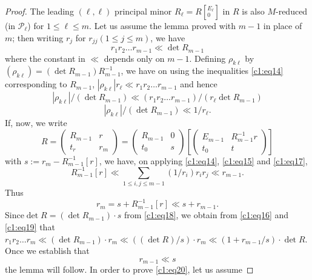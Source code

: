 \begin{proof}
The leading $(\ell,\ell)$ principal minor
$R_{\ell}=R[{}^{E_{\ell}}_{0}]$ in $R$ is also $M$-reduced (in
$\mathscr{P}_{\ell}$) for $1\leq \ell\leq m$. Let us assume the lemma
proved with $m-1$ in place of $m$; then writing $r_{j}$ for
$r_{jj}(1\leq j\leq m)$, we have
\begin{equation*}
r_{1}r_{2}\ldots r_{m-1}\ll \det R_{m-1}\tag{16}\label{c1:eq16}
\end{equation*}
where the constant in $\ll$ depends only on $m-1$. Defining
$\rho_{k\ell}$ by $(\rho_{k\ell})=(\det R_{m-1})R^{-1}_{m-1}$, we have
on using the inequalities \eqref{c1:eq14} corresponding to $R_{m-1}$,
$|\rho_{k\ell}|r_{\ell}\ll r_{1}r_{2}\ldots r_{m-1}$ and hence
$$
|\rho_{k\ell}|/(\det R_{m-1})\ll (r_{1}r_{2}\ldots
r_{m-1})/(r_{\ell}\det R_{m-1})
$$
\ie
\begin{equation*}
|\rho_{k\ell}|/(\det R_{m-1})\ll 1/r_{\ell}.\tag{17}\label{c1:eq17}
\end{equation*}
If, now, we write
\begin{equation*}
R=
\begin{pmatrix}
R_{m-1} & r\\
t_{r} & r_{m}
\end{pmatrix}
=
\begin{pmatrix}
R_{m-1} & 0\\
t_{0} & s
\end{pmatrix}
\left[
\begin{pmatrix}
E_{m-1} & R^{-1}_{m-1}r\\
t_{0} & t
\end{pmatrix}
\right]\tag{18}\label{c1:eq18}
\end{equation*}
with $s:=r_{m}-R^{-1}_{m-1}[r]$, we have, on applying \eqref{c1:eq14},
\eqref{c1:eq15} and \eqref{c1:eq17},
$$
R^{-1}_{m-1}[r]\ll \sum_{1\leq i,j\leq m-1}(1/r_{i})r_{i}r_{j}\ll r_{m-1}.
$$
Thus
\begin{equation*}
r_{m}=s+R^{-1}_{m-1}[r]\ll s+r_{m-1}.\tag{19}\label{c1:eq19}
\end{equation*}
Since\pageoriginale $\det R=(\det R_{m-1})\cdot s$ from \eqref{c1:eq18},
we obtain from \eqref{c1:eq16} and \eqref{c1:eq19} that $r_{1}r_{2}\ldots
r_{m}\ll (\det R_{m-1})\cdot r_{m}\ll ((\det R)/s)\cdot r_{m}\ll
(1+r_{m-1}/s)\cdot \det R$. Once we establish that
\begin{equation*}
r_{m-1}\ll s\tag{20}\label{c1:eq20}
\end{equation*}
the lemma will follow. In order to prove \eqref{c1:eq20}, let us assume

\end{proof}
